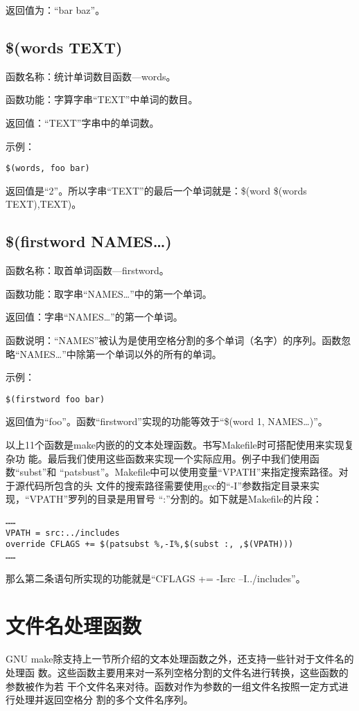 返回值为：“bar baz”。


\subsection{\$(words TEXT)}

函数名称：统计单词数目函数—words。

函数功能：字算字串“TEXT”中单词的数目。

返回值：“TEXT”字串中的单词数。

示例：


\begin{Verbatim}[]
$(words, foo bar)
\end{Verbatim}

返回值是“2”。所以字串“TEXT”的最后一个单词就是：\$(word \$(words TEXT),TEXT)。

\subsection{\$(firstword NAMES…)}

函数名称：取首单词函数—firstword。

函数功能：取字串“NAMES…”中的第一个单词。

返回值：字串“NAMES…”的第一个单词。

函数说明：“NAMES”被认为是使用空格分割的多个单词（名字）的序列。函数忽略“NAMES…”中除第一个单词以外的所有的单词。

示例：
\begin{Verbatim}[]
$(firstword foo bar)
\end{Verbatim}

返回值为“foo”。函数“firstword”实现的功能等效于“\$(word 1, NAMES…)”。

以上11个函数是make内嵌的的文本处理函数。书写Makefile时可搭配使用来实现复杂功
能。最后我们使用这些函数来实现一个实际应用。例子中我们使用函数“subst”和
“patsbust”。Makefile中可以使用变量“VPATH”来指定搜索路径。对于源代码所包含的头
文件的搜索路径需要使用gcc的“-I”参数指定目录来实现，“VPATH”罗列的目录是用冒号
“:”分割的。如下就是Makefile的片段：

\begin{Verbatim}[]
……
VPATH = src:../includes
override CFLAGS += $(patsubst %,-I%,$(subst :, ,$(VPATH)))
……
\end{Verbatim}

那么第二条语句所实现的功能就是“CFLAGS += -Isrc –I../includes”。

\section{文件名处理函数}
GNU make除支持上一节所介绍的文本处理函数之外，还支持一些针对于文件名的处理函
数。这些函数主要用来对一系列空格分割的文件名进行转换，这些函数的参数被作为若
干个文件名来对待。函数对作为参数的一组文件名按照一定方式进行处理并返回空格分
割的多个文件名序列。



